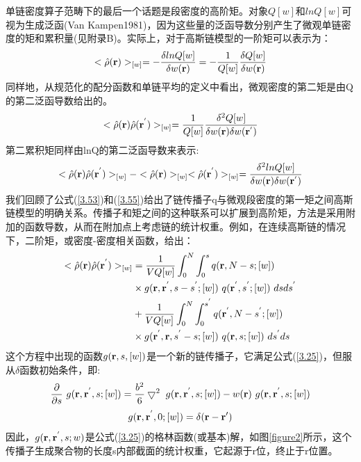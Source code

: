 单链密度算子范畴下的最后一个话题是段密度的高阶矩。对象$Q[w]$和$ln Q[w]$可视为生成泛函(Van Kampen1981)，因为这些量的泛函导数分别产生了微观单链密度的矩和累积量(见附录B)。实际上，对于高斯链模型的一阶矩可以表示为：
\begin{equation}\label{3.70}
<\hat{\rho}(\mathbf{r})>_{[w]}=-\frac{\delta lnQ[w]}{\delta w(\mathbf{r})}=-\frac{1}{Q[w]}\frac{\delta Q[w]}{\delta w(\mathbf{r})}
\end{equation}
同样地，从规范化的配分函数和单链平均的定义中看出，微观密度的第二矩是由Q的第二泛函导数给出的。
\begin{equation}\label{3.71}
<\hat{\rho}(\mathbf{r})\hat{\rho}(\mathbf{r}^{'})>_{[w]}=\frac{1}{Q[w]}\frac{\delta^2 Q[w]}{\delta w(\mathbf{r})\delta  w(\mathbf{r}^{'})}
\end{equation}
第二累积矩同样由lnQ的第二泛函导数来表示:
\begin{equation}\label{3.72}
<\hat{\rho}(\mathbf{r})\hat{\rho}(\mathbf{r}^{'})>_{[w]}-<\hat{\rho}(\mathbf{r})>_{[w]}<\hat{\rho}(\mathbf{r}^{'})>_{[w]}=\frac{\delta^2 lnQ[w]}{\delta w(\mathbf{r})\delta w(\mathbf{r}^{'})}
\end{equation}
我们回顾了公式(\ref{3.53})和(\ref{3.55})给出了链传播子q与微观段密度的第一矩之间高斯链模型的明确关系。传播子和矩之间的这种联系可以扩展到高阶矩，方法是采用附加的函数导数，从而在附加点上考虑链的统计权重。例如，在连续高斯链的情况下，二阶矩，或密度-密度相关函数，给出：
\begin{equation}\label{3.73}
\begin{aligned}
<\hat{\rho}(\mathbf{r})\hat{\rho}(\mathbf{r}^{'})>_{[w]}&=\frac{1}{VQ[w]}\int_{0}^{N} \int_{0}^{s}q(\mathbf{r},N-s;[w])\\&\times g(\mathbf{r},\mathbf{r}^{'},s-s^{'};[w])~q(\mathbf{r}^{'},s^{'};[w])~dsds^{'}\\&+\frac{1}{VQ[w]}\int_{0}^{N} \int_{0}^{s^{'}}q(\mathbf{r}^{'},N-s^{'};[w])\\&\times g(\mathbf{r}^{'},\mathbf{r},s^{'}-s;[w])~q(\mathbf{r},s;[w])~ds^{'}ds
\end{aligned}
\end{equation}
这个方程中出现的函数$g(\mathbf{r},s,[w])$是一个新的链传播子，它满足公式(\ref{3.25})，但服从$\delta$函数初始条件，即:
\begin{equation}\label{3.74}
\frac{\partial}{\partial s}~g(\mathbf{r},\mathbf{r}^{'},s;[w])=\frac{b^2}{6}\bigtriangledown^2~g(\mathbf{r},\mathbf{r}^{'},s;[w])-w(\mathbf{r})~g(\mathbf{r},\mathbf{r}^{'},s;[w])
\end{equation}
\begin{equation}\label{3.75}
g(\mathbf{r},\mathbf{r}^{'},0;[w])=\delta(\mathbf{r}-\mathbf{r}{'})
\end{equation}
因此，$g(\mathbf{r},\mathbf{r}^{'},s;w)$是公式(\ref{3.25})的格林函数(或基本)解，如图\ref{figure2}所示，这个传播子生成聚合物的长度s内部截面的统计权重，它起源于r位，终止于r位置。

